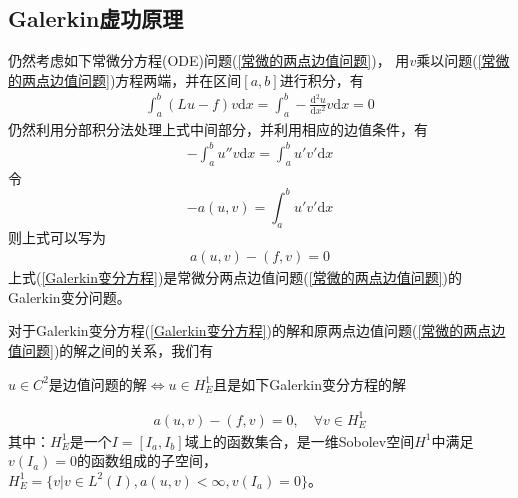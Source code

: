     \subsection{Galerkin虚功原理}
        \label{subsec:Galerkin虚功原理}
        \par
        仍然考虑如下常微分方程(ODE)问题(\ref{常微的两点边值问题})，
        用$v$乘以问题(\ref{常微的两点边值问题})方程两端，并在区间$[a,b]$进行积分，有
        \begin{align*}
            \int_a^b(Lu - f) v \mathrm{d}x = \int_a^b -   \frac{\mathrm{d} ^2u}{\mathrm{d} x^2} v \mathrm{d}x = 0
        \end{align*}
        仍然利用分部积分法处理上式中间部分，并利用相应的边值条件，有
        \begin{align*}
            -\int_a^b u''v\mathrm{d} x = \int_a^b u' v'\mathrm{d} x
        \end{align*}
        令
        \[
            -a(u,v) = \int_a^b u'v' \mathrm{d} x
        \]
        则上式可以写为
        \begin{align}
            \label{Galerkin变分方程}
            a(u,v) - (f,v) = 0
        \end{align}
        上式(\ref{Galerkin变分方程})是常微分两点边值问题(\ref{常微的两点边值问题})的Galerkin变分问题。
        \par
        对于Galerkin变分方程(\ref{Galerkin变分方程})的解和原两点边值问题(\ref{常微的两点边值问题})的解之间的关系，我们有
        \begin{center}
            $u\in C^2$是边值问题的解$\Longleftrightarrow u\in H_E^1$且是如下Galerkin变分方程的解
        \end{center}
        \begin{align*}
            a(u,v) - (f,v) = 0,\quad \forall v\in H_E^1
        \end{align*}
        其中：$H_E^1$是一个$I = [I_a,I_b]$域上的函数集合，是一维Sobolev空间$H^1$中满足$v(I_a) = 0$的函数组成的子空间，$H_E^1 = \{ v|v\in L^2(I),a(u,v)<\infty,v(I_a) = 0\}$。

